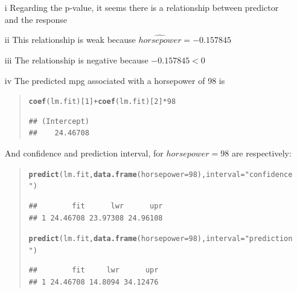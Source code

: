 \documentclass[a4paper, 10pt]{scrartcl}\usepackage[]{graphicx}\usepackage[]{color}
\makeatletter
\newcommand{\hlnum}[1]{\textcolor[rgb]{0.686,0.059,0.569}{#1}}%
\newcommand{\hlstr}[1]{\textcolor[rgb]{0.192,0.494,0.8}{#1}}%
\newcommand{\hlopt}[1]{\textcolor[rgb]{0,0,0}{#1}}%
\newcommand{\hlstd}[1]{\textcolor[rgb]{0.345,0.345,0.345}{#1}}%
\newcommand{\hlkwc}[1]{\textcolor[rgb]{0.333,0.667,0.333}{#1}}%
\newcommand{\hlkwd}[1]{\textcolor[rgb]{0.737,0.353,0.396}{\textbf{#1}}}%
\newenvironment{kframe}{%
 \def\at@end@of@kframe{}%
 \ifinner\ifhmode%
  \def\at@end@of@kframe{\end{minipage}}%
  \begin{minipage}{\columnwidth}%
 \fi\fi%
 \def\FrameCommand##1{\hskip\@totalleftmargin \hskip-\fboxsep
 \colorbox{shadecolor}{##1}\hskip-\fboxsep
     \hskip-\linewidth \hskip-\@totalleftmargin \hskip\columnwidth}%
 \MakeFramed {\advance\hsize-\width
   \@totalleftmargin\z@ \linewidth\hsize
   \@setminipage}}%
 {\par\unskip\endMakeFramed%
 \at@end@of@kframe}
\newenvironment{knitrout}{}{} %
\makeatother
\begin{document}
\begin{itemize}
	\item[i] Regarding the p-value, it seems there is a 
		relationship between predictor and the response
	\item[ii] This relationship is weak because  
		$\widehat{horsepower}=-0.157845$
	\item[iii] The relationship is negative because $-0.157845<0$
	\item[iv] The predicted mpg associated with a horsepower 
		of 98 is
		\begin{abstract}
\begin{knitrout}
\color{fgcolor}\begin{kframe}
\begin{alltt}
\hlkwd{coef}\hlstd{(lm.fit)[}\hlnum{1}\hlstd{]} \hlopt{+} \hlkwd{coef}\hlstd{(lm.fit)[}\hlnum{2}\hlstd{]}\hlopt{*}\hlnum{98}
\end{alltt}
\begin{verbatim}
## (Intercept) 
##    24.46708
\end{verbatim}
\end{kframe}
\end{knitrout}
		\end{abstract}
		And confidence and prediction interval, for 
		$horsepower=98$ are respectively:
		\begin{abstract}
\begin{knitrout}
\color{fgcolor}\begin{kframe}
\begin{alltt}
\hlkwd{predict}\hlstd{(lm.fit,} \hlkwd{data.frame}\hlstd{(}\hlkwc{horsepower}\hlstd{=}\hlnum{98}\hlstd{),} \hlkwc{interval}\hlstd{=}\hlstr{"confidence"}\hlstd{)}
\end{alltt}
\begin{verbatim}
##        fit      lwr      upr
## 1 24.46708 23.97308 24.96108
\end{verbatim}
\begin{alltt}
\hlkwd{predict}\hlstd{(lm.fit,} \hlkwd{data.frame}\hlstd{(}\hlkwc{horsepower}\hlstd{=}\hlnum{98}\hlstd{),} \hlkwc{interval}\hlstd{=}\hlstr{"prediction"}\hlstd{)}
\end{alltt}
\begin{verbatim}
##        fit     lwr      upr
## 1 24.46708 14.8094 34.12476
\end{verbatim}
\end{kframe}
\end{knitrout}
		\end{abstract}
\end{itemize}
\end{document}

